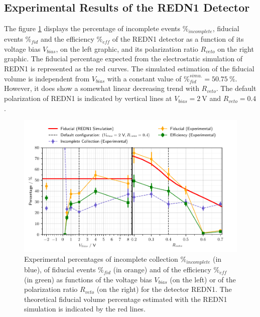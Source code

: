 \subsection{Experimental Results of the REDN1 Detector}

The figure \ref{fig:redn1-experimental-fiducial-volume} displays the percentage of incomplete events $\%_{incomplete}$, fiducial events $\%_{fid}$ and the efficiency $\%_{eff}$ of the REDN1 detector as a function of its voltage bias $V_{bias}$, on the left graphic, and its polarization ratio $R_{veto}$ on the right graphic. The fiducial percentage expected from the electrostatic simulation of REDN1 is represented as the red curves. The simulated estimation of the fiducial volume is independent from $V_{bias}$ with a constant value of $\%_{fid}^{simu.}=\SI{50.75}{\percent}$. However, it does show a somewhat linear decreasing trend with $R_{veto}$. The default polarization of REDN1 is indicated by vertical lines at $V_{bias}=\SI{2}{\volt}$ and $R_{veto}=0.4$.

\begin{figure}
\centering
\includegraphics[scale=1]{Figures/ElectrodesExperimental/redn1_experimental_fiducial_volume.pdf}
\caption{Experimental percentages of incomplete collection $\%_{incomplete}$ (in blue), of fiducial events $\%_{fid}$ (in orange) and of the efficiency $\%_{eff}$ (in green) as functions of the voltage bias $V_{bias}$ (on the left) or of the polarization ratio $R_{veto}$ (on the right) for the detector REDN1. The theoretical fiducial volume percentage estimated with the REDN1 simulation is indicated by the red lines.}
\label{fig:redn1-experimental-fiducial-volume}
\end{figure}

